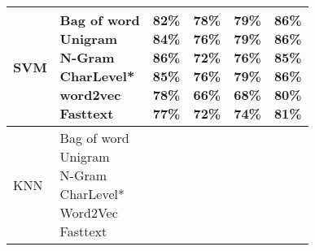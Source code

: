 \documentclass[sn-mathphys,Numbered]{sn-jnl}%
\begin{document}
\begin{table}[ht]
\begin{tabular}{llllll}
SVM & \makecell{Bag of word\\  Unigram\\ N-Gram\\CharLevel* \\ word2vec \\Fasttext} & 
\makecell{82\% \\84\%\\ \textbf{86\%}\\ 85\%\\ 78\% \\77\%}&
\makecell{\textbf{78\%} \\ 76\%\\ 72\%\\ 76\%\\ 66\% \\72\%}&
\makecell{\textbf{79\%} \\ \textbf{79\%}\\76\%\\\textbf{ 79\%}\\ 68\% \\74\%}&
\makecell{\textbf{86\%} \\ 86\%\\85\%\\ \textbf{86\%}\\  80\% \\81\%}\\
\hline
KNN & \makecell{Bag of word\\  Unigram\\ N-Gram\\CharLevel*\\ Word2Vec \\ Fasttext} & 

\end{tabular}
\end{table}
\end{document}
